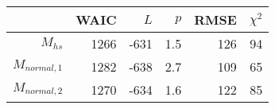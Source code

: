 \begin{tabular}{rrrrrr}
  \hline
 & WAIC & $L$ & $p$ & RMSE & $\chi^2$ \\ 
  \hline
$M_{hs}$ & 1266 & -631 & 1.5 & 126 & 94 \\ 
  $M_{normal,1}$ & 1282 & -638 & 2.7 & 109 & 65 \\ 
  $M_{normal,2}$ & 1270 & -634 & 1.6 & 122 & 85 \\ 
   \hline
\end{tabular}
